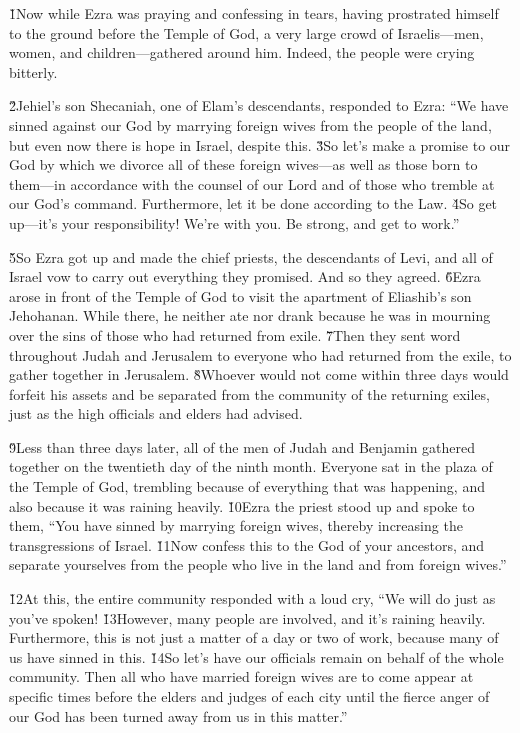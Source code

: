 \v{1}Now while Ezra was praying and confessing in tears, having prostrated himself to the ground before the Temple of God, a very large crowd of Israelis---men, women, and children---gathered around him. Indeed, the people were crying bitterly.

\v{2}Jehiel's son Shecaniah, one of Elam's descendants, responded to Ezra: ``We have sinned against our God by marrying foreign wives from the people of the land, but even now there is hope in Israel, despite this. \v{3}So let's make a promise to our God by which we divorce all of these foreign wives---as well as those born to them---in accordance with the counsel of our Lord and of those who tremble at our God's command. Furthermore, let it be done according to the Law. \v{4}So get up---it's your responsibility! We're with you. Be strong, and get to work.''

\v{5}So Ezra got up and made the chief priests, the descendants of Levi, and all of Israel vow to carry out everything they promised. And so they agreed. \v{6}Ezra arose in front of the Temple of God to visit the apartment of Eliashib's son Jehohanan. While there, he neither ate nor drank because he was in mourning over the sins of those who had returned from exile. \v{7}Then they sent word throughout Judah and Jerusalem to everyone who had returned from the exile, to gather together in Jerusalem. \v{8}Whoever would not come within three days would forfeit his assets and be separated from the community of the returning exiles, just as the high officials and elders had advised.

\v{9}Less than three days later, all of the men of Judah and Benjamin gathered together on the twentieth day of the ninth month. Everyone sat in the plaza of the Temple of God, trembling because of everything that was happening, and also because it was raining heavily. \v{10}Ezra the priest stood up and spoke to them, ``You have sinned by marrying foreign wives, thereby increasing the transgressions of Israel. \v{11}Now confess this to the  God of your ancestors, and separate yourselves from the people who live in the land and from foreign wives.''

\v{12}At this, the entire community responded with a loud cry, ``We will do just as you've spoken! \v{13}However, many people are involved, and it's raining heavily. Furthermore, this is not just a matter of a day or two of work, because many of us have sinned in this. \v{14}So let's have our officials remain on behalf of the whole community. Then all who have married foreign wives are to come appear at specific times before the elders and judges of each city until the fierce anger of our God has been turned away from us in this matter.''

